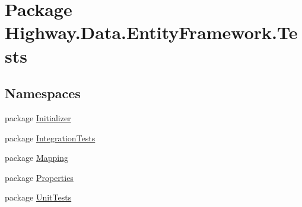 \hypertarget{namespace_highway_1_1_data_1_1_entity_framework_1_1_tests}{\section{Package Highway.\-Data.\-Entity\-Framework.\-Tests}
\label{namespace_highway_1_1_data_1_1_entity_framework_1_1_tests}
}
\subsection*{Namespaces}
\begin{DoxyCompactItemize}
\item 
package \hyperlink{namespace_highway_1_1_data_1_1_entity_framework_1_1_tests_1_1_initializer}{Initializer}
\item 
package \hyperlink{namespace_highway_1_1_data_1_1_entity_framework_1_1_tests_1_1_integration_tests}{Integration\-Tests}
\item 
package \hyperlink{namespace_highway_1_1_data_1_1_entity_framework_1_1_tests_1_1_mapping}{Mapping}
\item 
package \hyperlink{namespace_highway_1_1_data_1_1_entity_framework_1_1_tests_1_1_properties}{Properties}
\item 
package \hyperlink{namespace_highway_1_1_data_1_1_entity_framework_1_1_tests_1_1_unit_tests}{Unit\-Tests}
\end{DoxyCompactItemize}
